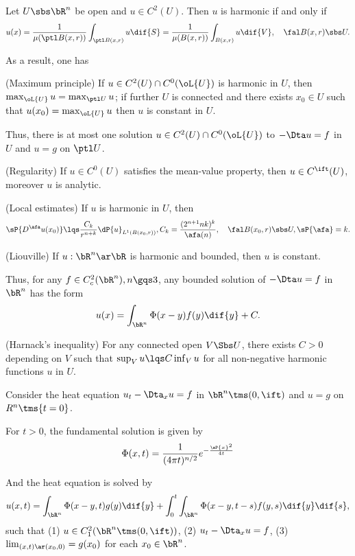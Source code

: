 \documentclass[article, a4paper, twoside]{universal}
\begin{document}
\begin{thm}
    Let $U\sbs\bR^{n}$ be open and $u\in C^{2}(U)$. Then $u$ is harmonic if and only if
    \[
        u(x)=\frac{1}{\mu(\ptl B(x,r))}\int_{\ptl B(x,r)}u\dif{S}=\frac{1}{\mu(B(x,r))}\int_{B(x,r)}u\dif{V},\quad\fal B(x,r)\sbs U.
    \]

    As a result, one has
    \begin{itm}
        \item (Maximum principle) If $u\in C^{2}(U)\cap C^{0}(\oL{U})$ is harmonic in $U$, then $\max_{\oL{U}}u=\max_{\ptl U}u$; if further $U$ is connected and there exists $x_{0}\in U$ such that $u(x_{0})=\max_{\oL{U}}u$ then $u$ is constant in $U$.

        Thus, there is at most one solution $u\in C^{2}(U)\cap C^{0}(\oL{U})$ to $-\Dta u=f$ in $U$ and $u=g$ on $\ptl U$.

        \item (Regularity) If $u\in C^{0}(U)$ satisfies the mean-value property, then $u\in C^{\ift}(U)$, moreover $u$ is analytic.
        \item (Local estimates) If $u$ is harmonic in $U$, then
        \[
            \sP{D^{\afa}u(x_{0})}\lqs\frac{C_{k}}{r^{n+k}}\dP{u}_{L^{1}(B(x_{0},r))}, C_{k}=\frac{(2^{n+1}nk)^{k}}{\afa(n)},\quad \fal B(x_{0},r)\sbs U, \sP{\afa}=k.
        \]
        \item (Liouville) If $u:\bR^{n}\ar\bR$ is harmonic and bounded, then $u$ is constant.

        Thus, for any $f\in C_{c}^{2}(\bR^{n}),n\gqs3$, any bounded solution of $-\Dta u=f$ in $\bR^{n}$ has the form
        \[
            u(x)=\int_{\bR^{n}}\Phi(x-y)f(y)\dif{y} +C.
        \]
        \item (Harnack's inequality) For any connected open $V\Sbs U$, there exists $C>0$ depending on $V$ such that $\sup_{V}u\lqs C\inf_{V}u$ for all non-negative harmonic functions $u$ in $U$.
    \end{itm}
\end{thm}



\begin{thm}
    Consider the heat equation $u_{t}-\Dta_{x}u=f$ in $\bR^{n}\tms(0,\ift)$ and $u=g$ on $R^{n}\tms\{t=0\}$.

    For $t>0$, the fundamental solution is given by
    \[
        \Phi(x,t)=\frac{1}{(4\pi t)^{n/2}}e^{-\frac{\sP{x}^{2}}{4t}}
    \]

    And the heat equation is solved by
    \[
        u(x,t)=\int_{\bR^{n}}\Phi(x-y,t)g(y)\dif{y}+\int_{0}^{t}\int_{\bR^{n}}\Phi(x-y,t-s)f(y,s)\dif{y}\dif{s},
    \]
    such that (1) $u\in C_{1}^{2}(\bR^{n}\tms(0,\ift))$, (2) $u_{t}-\Dta_{x}u=f$, (3) $\lim_{(x,t)\ar(x_{0},0)}=g(x_{0})$ for each $x_{0}\in\bR^{n}$.
\end{thm}
\end{document}
